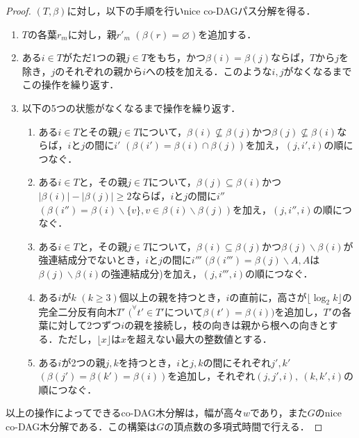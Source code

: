 \documentclass[master]{kuisthesis}		%
\theoremstyle{plain}
\theoremstyle{definition}
\begin{document}
\begin{proof}
    $(T, \beta)$に対し，以下の手順を行いnice co-DAGパス分解を得る．

    \begin{enumerate}
        \item $T$の各葉$r_m$に対し，親$r'_m$ $(\beta(r) = \varnothing)$を追加する．
        \item ある$i \in T$がただ1つの親$j \in T$をもち，かつ$\beta(i) = \beta(j)$ならば，$T$から$j$を除き，$j$のそれぞれの親から$i$への枝を加える．このような$i, j$がなくなるまでこの操作を繰り返す．
        \item 以下の5つの状態がなくなるまで操作を繰り返す．
        \begin{enumerate}
            \item ある$i \in T$とその親$j \in T$について，$\beta(i) \nsubseteq \beta(j)$かつ$\beta(j) \nsubseteq \beta(i)$ならば，$i$と$j$の間に$i'$ $(\beta(i') = \beta(i) \cap \beta(j))$を加え，$(j, i', i)$の順につなぐ．
            \item ある$i \in T$と，その親$j \in T$について，$\beta(j) \subseteq \beta(i)$かつ$|\beta(i)| - |\beta(j)| \geq 2$ならば，$i$と$j$の間に$i''$ $(\beta(i'') = \beta(i) \backslash \{v\}, v \in \beta(i) \backslash \beta(j))$を加え，$(j, i'', i)$の順につなぐ．
            \item ある$i \in T$と，その親$j \in T$について，$\beta(i) \subseteq \beta(j)$かつ$\beta(j) \backslash \beta(i)$が強連結成分でないとき，$i$と$j$の間に$i'''$ $(\beta(i''') = \beta(j) \backslash A, A$は$\beta(j) \backslash \beta(i)$の強連結成分)を加え，$(j, i''', i)$の順につなぐ．
            \item ある$i$が$k$ $(k \geq 3)$個以上の親を持つとき，$i$の直前に，高さが$\lfloor \log_{2} k \rfloor$の完全二分反有向木$T'$ $(^{\forall}t' \in T'$について$\beta(t') = \beta(i))$を追加し，$T'$の各葉に対して2つずつ$i$の親を接続し，枝の向きは親から根への向きとする．ただし，$\lfloor x \rfloor$は$x$を超えない最大の整数値とする．
            \item ある$i$が2つの親$j, k$を持つとき，$i$と$j, k$の間にそれぞれ$j', k'$ $(\beta(j') = \beta(k') = \beta(i))$を追加し，それぞれ$(j, j', i),\ (k, k', i)$の順につなぐ．
        \end{enumerate}
    \end{enumerate}

    以上の操作によってできるco-DAG木分解は，幅が高々$w$であり，また$G$のnice co-DAG木分解である．この構築は$G$の頂点数の多項式時間で行える．
\end{proof}
\end{document}
